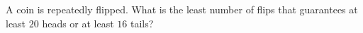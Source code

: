 A coin is repeatedly flipped. What is the least number of flips that guarantees at least $20$ heads or at least $16$ tails?
